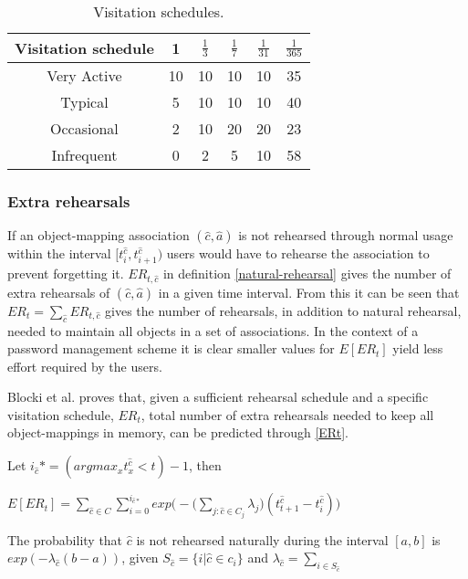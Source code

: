 \begin{table}
    \centering
\begin{tabular}{|c||c|c|c|c|c|}
    \hline
    Visitation schedule & 1 & $\frac{1}{3}$ & $\frac{1}{7}$ & $\frac{1}{31}$ & $\frac{1}{365}$ \\
    \hline \hline
    Very Active & 10 &10 &10 &10 & 35 \\
    \hline
    Typical & 5 & 10 & 10 & 10 & 40 \\
    \hline
    Occasional & 2 & 10 & 20 & 20 & 23 \\
    \hline
    Infrequent & 0 & 2 & 5 & 10 &  58 \\
    \hline
\end{tabular}
\caption{Visitation schedules.}
\label{users}
\end{table}

\subsubsection{Extra rehearsals}
If an object-mapping association $(\hat c, \hat a)$ is not rehearsed through normal usage within the interval $[t^{\hat c}_i, t^{\hat c}_{i+1})$ users would have to rehearse the association to prevent forgetting it. $ER_{t,\hat c}$ in definition \ref{natural-rehearsal} gives the number of extra rehearsals of $(\hat c, \hat a)$ in a given time interval. From this it can be seen that $ER_t = \sum_{\hat c} ER_{t, \hat c}$ gives the number of rehearsals, in addition to natural rehearsal, needed to maintain all objects in a set of associations. In the context of a password management scheme it is clear smaller values for $E[ER_t]$ yield less effort required by the users.
\par Blocki et al.\cite{naturally-rehearsing} proves that, given a sufficient rehearsal schedule  and a specific visitation schedule, $ER_t$, total number of extra rehearsals needed to keep all object-mappings in memory, can be predicted through \autoref{ERt}. 


\begin{theorem}\label{ERt}
    \cite{naturally-rehearsing} Let $i_{\hat c}* = (arg max_x t^{\hat c}_x < t)- 1 $, then 

    $ E[ER_t] = \sum_{\hat c \in C} \sum^{i_{\hat c *}}_{i=0} exp\bigg(-\bigg(\sum\limits_{j:\hat c \in C_j} \lambda_j \bigg)(t^{\hat c}_{t+1} - t^{\hat c}_i)\bigg)$
\end{theorem}

\begin{lemma}
    \cite{naturally-rehearsing} The probability that $\hat c$ is not rehearsed naturally during the interval $[a,b]$ is $exp(-\lambda_{\hat c} (b-a))$, given $S_{\hat c} = \{i \vert \hat c \in c_i \}$ and $\lambda_{\hat c}= \sum_{i \in S_{\hat c}}$
\end{lemma}














